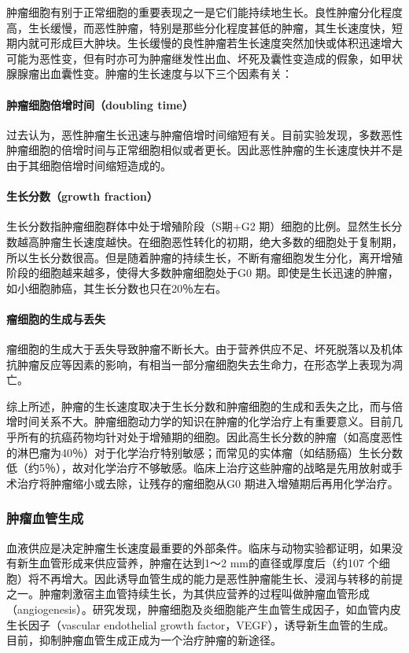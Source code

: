 肿瘤细胞有别于正常细胞的重要表现之一是它们能持续地生长。良性肿瘤分化程度高，生长缓慢，而恶性肿瘤，特别是那些分化程度甚低的肿瘤，其生长速度快，短期内就可形成巨大肿块。生长缓慢的良性肿瘤若生长速度突然加快或体积迅速增大可能为恶性变，但有时亦可为肿瘤继发性出血、坏死及囊性变造成的假象，如甲状腺腺瘤出血囊性变。肿瘤的生长速度与以下三个因素有关：

\paragraph{肿瘤细胞倍增时间（doubling time）}
过去认为，恶性肿瘤生长迅速与肿瘤倍增时间缩短有关。目前实验发现，多数恶性肿瘤细胞的倍增时间与正常细胞相似或者更长。因此恶性肿瘤的生长速度快并不是由于其细胞倍增时间缩短造成的。

\paragraph{生长分数（growth fraction）}
生长分数指肿瘤细胞群体中处于增殖阶段（S期+G{2}
期）细胞的比例。显然生长分数越高肿瘤生长速度越快。在细胞恶性转化的初期，绝大多数的细胞处于复制期，所以生长分数很高。但是随着肿瘤的持续生长，不断有瘤细胞发生分化，离开增殖阶段的细胞越来越多，使得大多数肿瘤细胞处于G{0}
期。即使是生长迅速的肿瘤，如小细胞肺癌，其生长分数也只在20％左右。

\paragraph{瘤细胞的生成与丢失}
瘤细胞的生成大于丢失导致肿瘤不断长大。由于营养供应不足、坏死脱落以及机体抗肿瘤反应等因素的影响，有相当一部分瘤细胞失去生命力，在形态学上表现为凋亡。

综上所述，肿瘤的生长速度取决于生长分数和肿瘤细胞的生成和丢失之比，而与倍增时间关系不大。肿瘤细胞动力学的知识在肿瘤的化学治疗上有重要意义。目前几乎所有的抗癌药物均针对处于增殖期的细胞。因此高生长分数的肿瘤（如高度恶性的淋巴瘤为40％）对于化学治疗特别敏感；而常见的实体瘤（如结肠癌）生长分数低（约5％），故对化学治疗不够敏感。临床上治疗这些肿瘤的战略是先用放射或手术治疗将肿瘤缩小或去除，让残存的瘤细胞从G{0}
期进入增殖期后再用化学治疗。

\subsubsection{肿瘤血管生成}

血液供应是决定肿瘤生长速度最重要的外部条件。临床与动物实验都证明，如果没有新生血管形成来供应营养，肿瘤在达到1～2
mm的直径或厚度后（约10{7}
个细胞）将不再增大。因此诱导血管生成的能力是恶性肿瘤能生长、浸润与转移的前提之一。肿瘤刺激宿主血管持续生长，为其供应营养的过程叫做肿瘤血管形成（angiogenesis）。研究发现，肿瘤细胞及炎细胞能产生血管生成因子，如血管内皮生长因子（vascular
endothelial growth
factor，VEGF），诱导新生血管的生成。目前，抑制肿瘤血管生成正成为一个治疗肿瘤的新途径。

